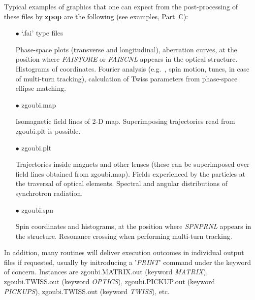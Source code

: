 \noindent Typical examples of graphics that one can expect from the 
post-processing of these files by \textbf{zpop}
are the following (see examples, Part~C):

\begin{itemize}
\item[$\bullet$] `.fai' type files 
  
  Phase-space plots (transverse and longitudinal), 
aberration curves, at the position where \textsl{FAISTORE}  or \textsl{FAISCNL} 
appears in the 
optical structure. Histograms of coordinates. Fourier analysis 
(e.g.~, spin motion, tunes, in case of multi-turn tracking), 
calculation of Twiss parameters from phase-space  ellipse matching.
\item[$\bullet$] zgoubi.map 
  
  Isomagnetic field lines of  2-D map. Superimposing 
trajectories read from zgoubi.plt is possible.
\item[$\bullet$] zgoubi.plt 
  
Trajectories inside magnets and other lenses (these can 
be superimposed over field lines obtained from zgoubi.map). 
Fields experienced by the particles at the traversal of optical 
elements. Spectral and angular distributions of synchrotron radiation.
\item[$\bullet$] zgoubi.spn
  
Spin coordinates and histograms, at the position where 
\textsl{SPNPRNL} appears in the structure. Resonance crossing when 
performing multi-turn tracking. 
\end{itemize}

\bigskip

\noindent In addition, many routines will deliver execution outcomes in individual output files if 
requested, usually by initroducing a '\textsl{PRINT}' command under the keyword of concern.  
Instances are 
zgoubi.MATRIX.out (keyword \textsl{MATRIX}), 
zgoubi.TWISS.out (keyword \textsl{OPTICS}), 
zgoubi.PICKUP.out (keyword \textsl{PICKUPS}), 
zgoubi.TWISS.out (keyword \textsl{TWISS}), 
etc.


